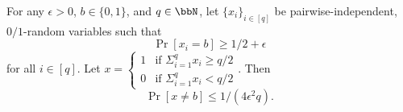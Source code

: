 \begin{theorem}
	For any $\epsilon > 0$, $b \in \{0,1\}$, and $q\in\N$, let $\{x_i\}_{i\in[q]}$ be pairwise-independent, $0/1$-random variables such that
	$$\Pr[x_i = b] \geq 1/2 + \epsilon$$ for all $i\in[q]$.
	Let $x = \begin{cases} 1 & \text{if $\Sigma_{i=1}^{q}x_i \geq q/2$}\\
	0 &  \text{if $\Sigma_{i=1}^{q}x_i < q/2$}
	\end{cases}$. Then
	$$ \Pr[x \neq b] \leq 1/(4\epsilon^2q).$$
\end{theorem}

